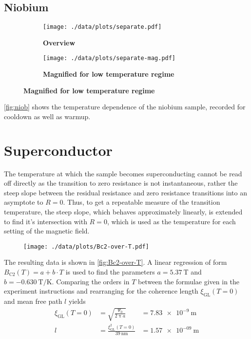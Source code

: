 \subsection{Niobium}
\begin{figure}
\begin{adjustwidth}{-1cm}{-1cm}
	\centering
	\begin{subfigure}{.55\textwidth}
		\centering
		\texttt{[image: ./data/plots/separate.pdf]}
		\caption{\textbf{Overview}}
	\end{subfigure}
	\hfill
	\begin{subfigure}{.55\textwidth}
		\centering
		\texttt{[image: ./data/plots/separate-mag.pdf]}
		\caption{\textbf{Magnified for low temperature regime}}
	\end{subfigure}
	\label{fig:niob}
\end{adjustwidth}
\end{figure}

\autoref{fig:niob} shows the temperature dependence of the niobium sample, recorded for cooldown as well as warmup.


\section{Superconductor}
The temperature at which the sample becomes superconducting cannot be read off directly as the transition to zero resistance is not instantaneous, rather the steep slope between the residual resistance and zero resistance transitions into an asymptote to $R = 0$.
Thus, to get a repeatable measure of the transition temperature, the steep slope, which behaves approximately linearly, is extended to find it's intersection with $R = 0$, which is used as the temperature for each setting of the magnetic field.
\begin{figure}
	\centering
	\texttt{[image: ./data/plots/Bc2-over-T.pdf]}
	\label{fig:Bc2-over-T}
\end{figure}
The resulting data is shown in \autoref{fig:Bc2-over-T}.
A linear regression of form $B_\text{C2}(T) = a + b \cdot T$ is used to find the parameters $a = \SI{5.37}{\tesla}$ and $b = \SI{-0.630}{\tesla\per\kelvin}$.
Comparing the orders in $T$ between the formulae given in the experiment instructions and rearranging for the coherence length $\xi_\text{GL}(T = 0)$ and mean free path $l$ yields
\begin{alignat*}{2}
	\xi_\text{GL}(T = 0) &= \sqrt{\frac{\Psi_0}{2 \uppi a}} &= \SI{7.83e-9}{\meter}\\
	l &= \frac{\xi^2_\text{GL}(T = 0)}{\SI{39}{\nano\meter}} &= \SI{1.57e-09}{\meter}
\end{alignat*}

